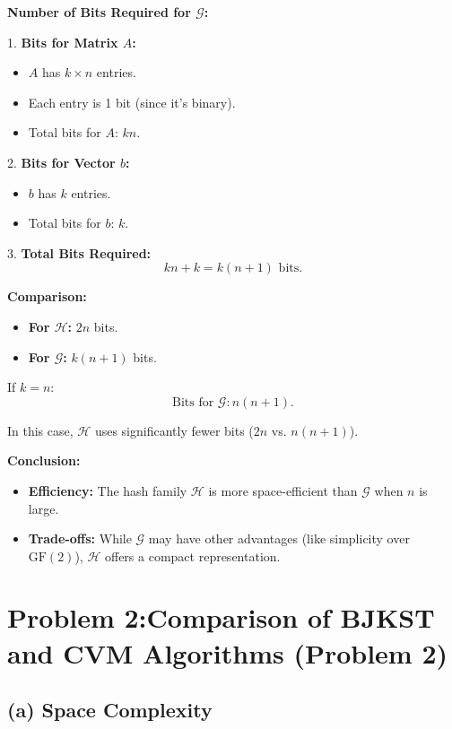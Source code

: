 \documentclass[12pt,letterpaper]{article}
\begin{document}
\textbf{Number of Bits Required for \( \mathcal{G} \):}

1. \textbf{Bits for Matrix \( A \):}
   \begin{itemize}
       \item \( A \) has \( k \times n \) entries.
       \item Each entry is 1 bit (since it's binary).
       \item Total bits for \( A \): \( k n \).
   \end{itemize}

2. \textbf{Bits for Vector \( b \):}
   \begin{itemize}
       \item \( b \) has \( k \) entries.
       \item Total bits for \( b \): \( k \).
   \end{itemize}

3. \textbf{Total Bits Required:}
   \[
   k n + k = k(n + 1) \text{ bits}.
   \]

\textbf{Comparison:}

\begin{itemize}
    \item \textbf{For \( \mathcal{H} \):} \( 2n \) bits.
    \item \textbf{For \( \mathcal{G} \):} \( k(n + 1) \) bits.
\end{itemize}

If \( k = n \):
   \[
   \text{Bits for } \mathcal{G}: n(n + 1).
   \]

In this case, \( \mathcal{H} \) uses significantly fewer bits (\( 2n \) vs. \( n(n + 1) \)).

\textbf{Conclusion:}
\begin{itemize}
    \item \textbf{Efficiency:} The hash family \( \mathcal{H} \) is more space-efficient than \( \mathcal{G} \) when \( n \) is large.
    \item \textbf{Trade-offs:} While \( \mathcal{G} \) may have other advantages (like simplicity over \( \text{GF}(2) \)), \( \mathcal{H} \) offers a compact representation.
\end{itemize}  




\section*{Problem 2:Comparison of BJKST and CVM Algorithms (Problem 2)}

\subsection*{(a) Space Complexity}
\end{document}

